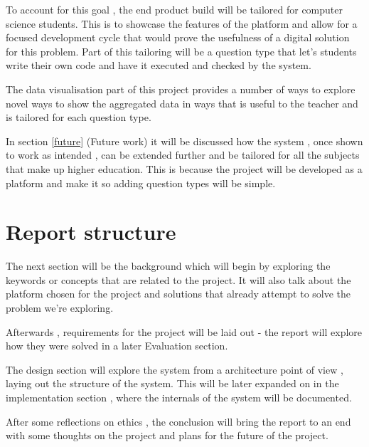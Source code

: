\documentclass[11pt]{informatics-report}
\begin{document}
To account for this goal , the end product build will be tailored for computer science students. This is to showcase the features of the platform and allow for a focused development cycle that would prove the usefulness of a digital solution for this problem. Part of this tailoring will be a question type that let's students write their own code and have it executed and checked by the system.

The data visualisation part of this project provides a number of ways to explore novel ways to show the aggregated data in ways that is useful to the teacher and is tailored for each question type.

In section \ref{future} (Future work) it will be discussed how the system , once shown to work as intended , can be extended further and be tailored for all the subjects that make up higher education. This is because the project will be developed as a platform and make it so adding question types will be simple.


\section{Report structure}
The next section will be the background which will begin by exploring the keywords or concepts that are related to the project. It will also talk about the platform chosen for the project and solutions that already attempt to solve the problem we're exploring.

Afterwards , requirements for the project will be laid out - the report will explore how they were solved in a later Evaluation section.

The design section will explore the system from a architecture point of view , laying out the structure of the system. This will be later expanded on in the implementation section , where the internals of the system will be documented.

After some reflections on ethics , the conclusion will bring the report to an end with some thoughts on the project and plans for the future of the project.












\appendix
%

%
\end{document}
